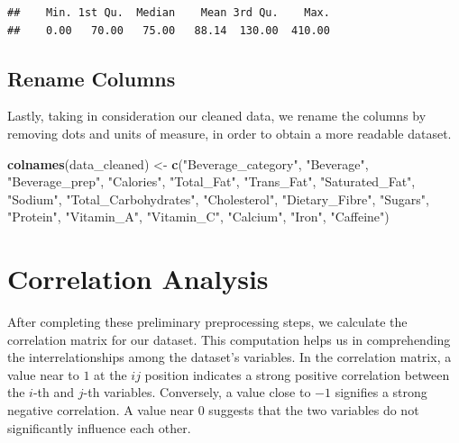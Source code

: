 \documentclass[
]{article}
\newenvironment{Shaded}{\begin{snugshade}}{\end{snugshade}}
\newcommand{\FunctionTok}[1]{\textcolor[rgb]{0.13,0.29,0.53}{\textbf{#1}}}
\newcommand{\NormalTok}[1]{#1}
\newcommand{\OtherTok}[1]{\textcolor[rgb]{0.56,0.35,0.01}{#1}}
\newcommand{\StringTok}[1]{\textcolor[rgb]{0.31,0.60,0.02}{#1}}
\begin{document}
\begin{verbatim}
##    Min. 1st Qu.  Median    Mean 3rd Qu.    Max. 
##    0.00   70.00   75.00   88.14  130.00  410.00
\end{verbatim}

\subsection{Rename Columns}\label{rename-columns}

Lastly, taking in consideration our cleaned data, we rename the columns
by removing dots and units of measure, in order to obtain a more
readable dataset.

\begin{Shaded}
\begin{Highlighting}[]
\FunctionTok{colnames}\NormalTok{(data\_cleaned) }\OtherTok{\textless{}{-}} \FunctionTok{c}\NormalTok{(}\StringTok{"Beverage\_category"}\NormalTok{, }\StringTok{"Beverage"}\NormalTok{, }\StringTok{"Beverage\_prep"}\NormalTok{,}
                            \StringTok{"Calories"}\NormalTok{, }\StringTok{"Total\_Fat"}\NormalTok{, }\StringTok{"Trans\_Fat"}\NormalTok{,}
                            \StringTok{"Saturated\_Fat"}\NormalTok{, }\StringTok{"Sodium"}\NormalTok{, }\StringTok{"Total\_Carbohydrates"}\NormalTok{,}
                            \StringTok{"Cholesterol"}\NormalTok{, }\StringTok{"Dietary\_Fibre"}\NormalTok{, }\StringTok{"Sugars"}\NormalTok{,}
                            \StringTok{"Protein"}\NormalTok{, }\StringTok{"Vitamin\_A"}\NormalTok{, }\StringTok{"Vitamin\_C"}\NormalTok{,}
                            \StringTok{"Calcium"}\NormalTok{, }\StringTok{"Iron"}\NormalTok{, }\StringTok{"Caffeine"}\NormalTok{)}
\end{Highlighting}
\end{Shaded}

\section{Correlation Analysis}\label{correlation-analysis}

After completing these preliminary preprocessing steps, we calculate the
correlation matrix for our dataset. This computation helps us in
comprehending the interrelationships among the dataset's variables. In
the correlation matrix, a value near to \(1\) at the \(ij\) position
indicates a strong positive correlation between the \(i\)-th and
\(j\)-th variables. Conversely, a value close to \(-1\) signifies a
strong negative correlation. A value near \(0\) suggests that the two
variables do not significantly influence each other.
\end{document}
